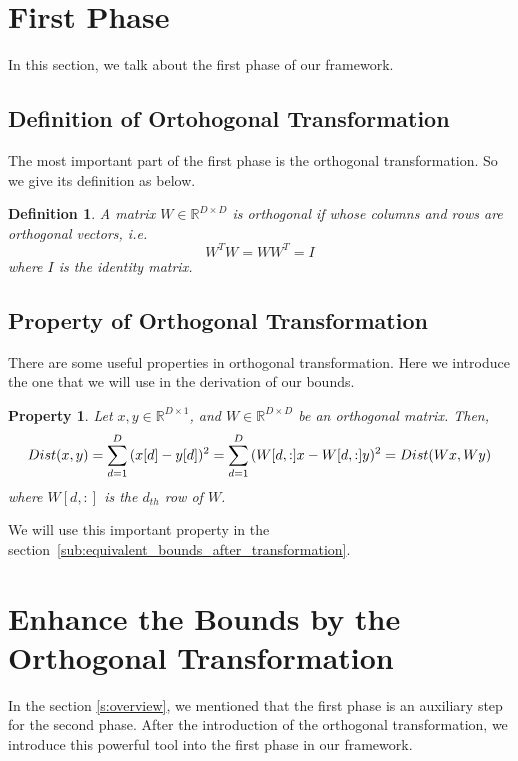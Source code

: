 \section{First Phase}
\label{s:first_phase}

In this section, we talk about the first phase of our framework.
\subsection{Definition of Ortohogonal Transformation}
\label{ss:ortho_def}

The most important part of the first phase is the orthogonal transformation.  So we give its definition as below.

\newtheorem{Orthogonal}{\bf Definition}
\begin{Orthogonal}
\normalfont
A matrix $W \in\mathbb{R}^{D\times D}$ is orthogonal if whose columns and rows are orthogonal vectors, i.e.
\[
W^{T}W=WW^{T}=I
\]
where $I$ is the identity matrix.
\end{Orthogonal}

\subsection{Property of Orthogonal Transformation}
\label{ss:ortho_prop}

There are some useful properties in orthogonal transformation.  Here we introduce the one that we will use in the derivation of our bounds.

\newtheorem{ProOfOrthogonal}{\bf Property}
\begin{ProOfOrthogonal}
\normalfont
Let $x, y\in\mathbb{R}^{D\times 1}$, and $W\in\mathbb{R}^{D\times D}$ be an orthogonal matrix. Then,
\[
Dist(x,y)=\sum^D_{d=1}{(x[d]-y[d])^2} \\
=\sum^D_{d=1}{(W[d,:]x-W[d,:]y)^2}=Dist(Wx,Wy)
\]
where $W[d,:]$ is the $d_{th}$ row of $W$.
\end{ProOfOrthogonal}

We will use this important property in the section~\ref{sub:equivalent_bounds_after_transformation}.

\section{Enhance the Bounds by the Orthogonal Transformation}
\label{s:ortho_bounds}
In the section \ref{s:overview}, we mentioned that the first phase is an auxiliary step for the second phase.  After the introduction of the orthogonal transformation, we introduce this powerful tool into the first phase in our framework.

